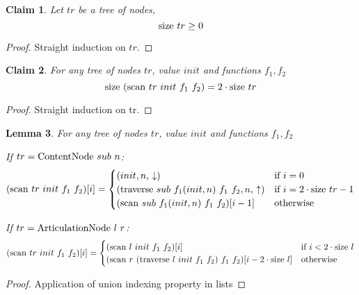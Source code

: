 \documentclass{article}
\newtheorem{lemma}{Lemma}
\newtheorem{claim}[lemma]{Claim}
\newcommand{\textfun}[1]{\textup{#1}}
\newcommand{\fone}[2]{\ensuremath{f_{1}(#1, #2)}}
\newcommand{\contentNode}[2]{\textfun{ContentNode}\ #1\ #2}
\newcommand{\artNode}[2]{\textfun{ArticulationNode}\ #1\ #2}
\newcommand{\longtraverse}[4]{\textfun{traverse}\ #1\ #2\ #3 \ #4}
\newcommand{\longscan}[4]{\textfun{scan}\ #1\ #2\ #3 \ #4}
\newcommand{\up}{\uparrow}
\newcommand{\down}{\downarrow}
\newcommand{\size}[1]{\textfun{size}\ #1}
\begin{document}
\begin{claim}
    \label{size_pos}
    Let $tr$ be a tree of nodes, 
    \[\size{tr} \geq 0 \] 
\end{claim}
\begin{proof}
    Straight induction on $tr$.
\end{proof}

\begin{claim}
    \label{scan_size}
    For any tree of nodes $tr$, value $init$ and functions $f_1, f_2$
    \[\size{(\longscan{tr}{init}{f_1}{f_2})} = 2 \cdot \size{tr}\]
\end{claim}

\begin{proof}
    Straight induction on tr.
\end{proof}

\begin{lemma}
    \label{scan_indexing}
    For any tree of nodes $tr$, value $init$ and functions $f_1, f_2$

    If $tr = \contentNode{sub}{n}$:
     \[(\longscan{tr}{init}{f_1}{f_2})[i] = 
        \begin{cases}
            (init, n,\,\down) & \text{if $i = 0$}\\
            (\longtraverse{sub}{\fone{init}{n}}{f_1}{f_2}, n,\,\up) & \text{if $i = 2 \cdot \size{tr} - 1$}\\
            (\longscan{sub}{\fone{init}{n}}{f_1}{f_2})[i - 1] & \text{otherwise}
        \end{cases}\]

    If $tr = \artNode{l}{r}$:
     \[(\longscan{tr}{init}{f_1}{f_2})[i] = 
        \begin{cases}
            (\longscan{l}{init}{f_1}{f_2})[i] & \text{if $i < 2\cdot \size{l}$}\\
            (\longscan{r}{(\longtraverse{l}{init}{f_1}{f_2})}{f_1}{f_2})[i - 2 \cdot \size{l}] & \text{otherwise}
        \end{cases}\]
        
\end{lemma}

\begin{proof}
    Application of union indexing property in lists
\end{proof}
\end{document}
